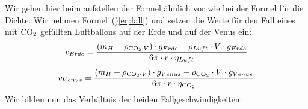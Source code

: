 \documentclass{article}
\begin{document}
        Wir gehen hier beim aufstellen der Formel ähnlich vor wie bei der Formel für die Dichte. Wir nehmen Formel~()\ref{eq:fall})
        und setzen die Werte für den Fall eines mit \(\ce{CO2}\) gefüllten Luftballons auf der Erde und auf der Venus ein:
        \begin{equation}
            v_{Erde} = \frac{ \left( m_H + \rho_{\ce{CO2} \cdot V } \right) \cdot g_{Erde} - \rho_{Luft} \cdot V \cdot g_{Erde} }{ 6\pi \cdot r \cdot \eta_{Luft} }
        \end{equation}
        \begin{equation}
            v_{Venus} = \frac{ \left( m_H + \rho_{\ce{CO2} \cdot V } \right) \cdot g_{Venus} - \rho_{\ce{CO2}} \cdot V \cdot g_{Venus} }{ 6\pi \cdot r \cdot \eta_{\ce{CO2}} }
        \end{equation}
        Wir bilden nun das Verhältnis der beiden Fallgeschwindigkeiten:
\end{document}
